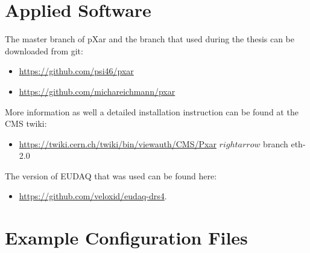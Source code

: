 \section{Applied Software}\label{ssoft}
The master branch of pXar and the branch that used during the thesis can be downloaded from git: 
\begin{itemize}
	\item \url{https://github.com/psi46/pxar}
	\item \url{https://github.com/michareichmann/pxar}
\end{itemize}
More information as well a detailed installation instruction can be found at the \ac{CMS} twiki: 
\begin{itemize}
	\item \url{https://twiki.cern.ch/twiki/bin/viewauth/CMS/Pxar} $rightarrow$ branch eth-2.0
\end{itemize}
The version of EUDAQ that was used can be found here: 
\begin{itemize}
	\item \url{https://github.com/veloxid/eudaq-drs4}. 
\end{itemize}
\section{Example Configuration Files}\label{sconfig}
